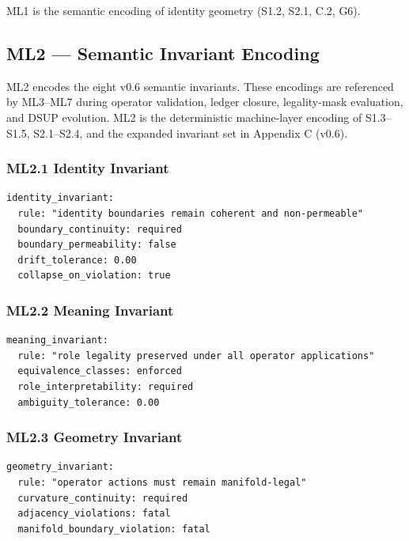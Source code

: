 ML1 is the semantic encoding of identity geometry (S1.2, S2.1, C.2, G6).


\subsection*{ML2 — Semantic Invariant Encoding}

ML2 encodes the eight v0.6 semantic invariants. These encodings are referenced
by ML3–ML7 during operator validation, ledger closure, legality-mask evaluation,
and DSUP evolution. ML2 is the deterministic machine-layer encoding of S1.3–S1.5,
S2.1–S2.4, and the expanded invariant set in Appendix C (v0.6).

\subsubsection*{ML2.1 Identity Invariant}

\begin{verbatim}
identity_invariant:
  rule: "identity boundaries remain coherent and non-permeable"
  boundary_continuity: required
  boundary_permeability: false
  drift_tolerance: 0.00
  collapse_on_violation: true
\end{verbatim}

\subsubsection*{ML2.2 Meaning Invariant}

\begin{verbatim}
meaning_invariant:
  rule: "role legality preserved under all operator applications"
  equivalence_classes: enforced
  role_interpretability: required
  ambiguity_tolerance: 0.00
\end{verbatim}

\subsubsection*{ML2.3 Geometry Invariant}

\begin{verbatim}
geometry_invariant:
  rule: "operator actions must remain manifold-legal"
  curvature_continuity: required
  adjacency_violations: fatal
  manifold_boundary_violation: fatal
\end{verbatim}

